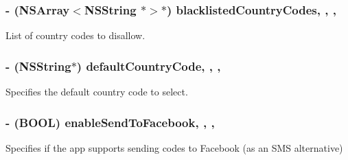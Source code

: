 \subsubsection[{blacklisted\+Country\+Codes}]{\setlength{\rightskip}{0pt plus 5cm}-\/ (N\+S\+Array$<$N\+S\+String $\ast$$>$$\ast$) blacklisted\+Country\+Codes\hspace{0.3cm}{\ttfamily [read]}, {\ttfamily [write]}, {\ttfamily [nonatomic]}, {\ttfamily [copy]}}\label{protocol_a_k_f_configuring-p_a8c2e2adfea2007af5455730501e3b6ac}
List of country codes to disallow. \hypertarget{protocol_a_k_f_configuring-p_adc9db4d85fc74d5ce644cea363e52fea}{}
\subsubsection[{default\+Country\+Code}]{\setlength{\rightskip}{0pt plus 5cm}-\/ (N\+S\+String$\ast$) default\+Country\+Code\hspace{0.3cm}{\ttfamily [read]}, {\ttfamily [write]}, {\ttfamily [nonatomic]}, {\ttfamily [copy]}}\label{protocol_a_k_f_configuring-p_adc9db4d85fc74d5ce644cea363e52fea}
Specifies the default country code to select. \hypertarget{protocol_a_k_f_configuring-p_af2f10df691c36d5e6a9191e7076d65c4}{}
\subsubsection[{enable\+Send\+To\+Facebook}]{\setlength{\rightskip}{0pt plus 5cm}-\/ (B\+O\+O\+L) enable\+Send\+To\+Facebook\hspace{0.3cm}{\ttfamily [read]}, {\ttfamily [write]}, {\ttfamily [nonatomic]}, {\ttfamily [assign]}}\label{protocol_a_k_f_configuring-p_af2f10df691c36d5e6a9191e7076d65c4}
Specifies if the app supports sending codes to Facebook (as an S\+M\+S alternative) \hypertarget{protocol_a_k_f_configuring-p_af865e3330eb55455b067b14de0ff27fd}{}
